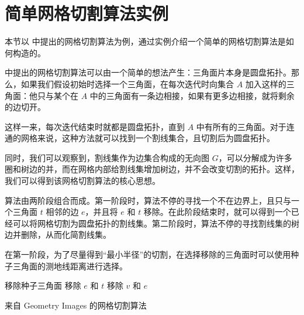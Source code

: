 \section{简单网格切割算法实例}

本节以 \citet{Gu2002} 中提出的网格切割算法为例，通过实例介绍一个简单的网格切割算法是如何构造的。

\citet{Gu2002} 中提出的网格切割算法可以由一个简单的想法产生：三角面片本身是圆盘拓扑。那么，如果我们假设初始时选择一个三角面，在每次迭代时向集合 $ A $ 加入这样的三角面：他只与某个在 $ A $ 中的三角面有一条边相接，如果有更多边相接，就将剩余的边切开。

这样一来，每次迭代结束时就都是圆盘拓扑，直到 $ A $ 中有所有的三角面。对于连通的网格来说，这种方法就可以找到一个割线集合，且切割后为圆盘拓扑。

同时，我们可以观察到，割线集作为边集合构成的无向图 $ G $，可以分解成为许多圈和树边的并，而在网格内部给割线集增加树边，并不会改变切割的拓扑。这样，我们可以得到该网格切割算法的核心思想。

算法由两阶段组合而成。第一阶段时，算法不停的寻找一个不在边界上，且只与一个三角面 $ t $ 相邻的边 $ e $，并且将 $ e $ 和 $ t $ 移除。在此阶段结束时，就可以得到一个已经可以将网格切割为圆盘拓扑的割线集。第二阶段时，算法不停的寻找割线集的树边并删除，从而化简割线集。

在第一阶段，为了尽量得到“最小半径”的切割，在选择移除的三角面时可以使用种子三角面的测地线距离进行选择。

\begin{algorithm}[h]
    \SetAlgoLined

    移除种子三角面\;
     {
      移除 $ e $ 和 $ t $\;
    }
     {
      移除 $ v $ 和 $ e $\;
    }
    \caption{来自 Geometry Images \cite{Gu2002}的网格切割算法}
\end{algorithm}



